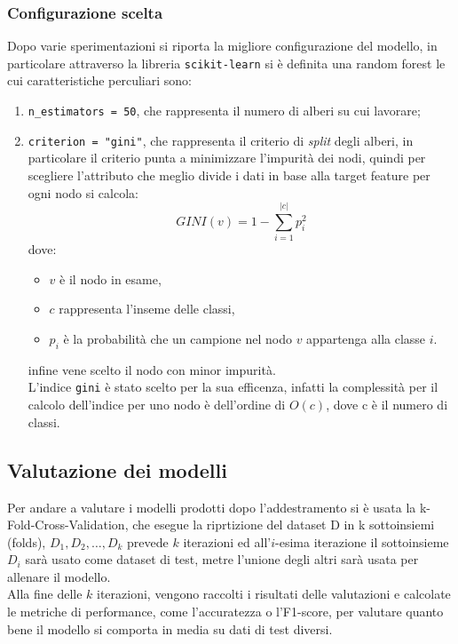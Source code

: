 \documentclass[italian,12pt,a4paper]{article}
\begin{document}
	\subsubsection{Configurazione scelta}
	Dopo varie sperimentazioni si riporta la migliore configurazione del modello, in particolare attraverso la libreria \texttt{scikit-learn} \cite{scikit_learn} si è definita una random forest le cui caratteristiche perculiari sono:
		\begin{enumerate}
			\item \texttt{n\_estimators = 50}, che rappresenta il numero di alberi su cui lavorare;
			\item  \texttt{criterion = "gini"}, che rappresenta il criterio di \textit{split} degli alberi, in particolare il criterio punta a minimizzare l'impurità dei nodi, quindi per scegliere l'attributo che meglio divide i dati in base alla target feature per ogni nodo si calcola:
				$$GINI(v) = 1-\sum_{i = 1}^{|c|}p_i^2$$
			dove:
				\begin{itemize}
					\item $v$ è il nodo in esame,
					\item $c$ rappresenta l'inseme delle classi,
					\item $p_i$ è la probabilità che un campione nel nodo $v$ appartenga alla classe $i$.
				\end{itemize}
			infine vene scelto il nodo con minor impurità. \\
			\linebreak
			L'indice \texttt{gini} è stato scelto per la sua efficenza, infatti la complessità per il calcolo dell'indice per uno nodo è dell'ordine di $O(c)$, dove c è il numero di classi.
			
		\end{enumerate}
	
	\subsection{Valutazione dei modelli}
	Per andare a valutare i modelli prodotti dopo l'addestramento si è usata la k-Fold-Cross-Validation, che esegue la riprtizione del dataset D in k sottoinsiemi (folds), $D_1, D_2, \dots , D_k$ prevede $k$ iterazioni ed all'$i$-esima iterazione il sottoinsieme $D_i$ sarà usato come dataset di test, metre l'unione degli altri sarà usata per allenare il modello. \\
	\linebreak
	Alla fine delle $k$ iterazioni, vengono raccolti i risultati delle valutazioni e calcolate le metriche di performance, come l'accuratezza o l'F1-score, per valutare quanto bene il modello si comporta in media su dati di test diversi.
\end{document}
